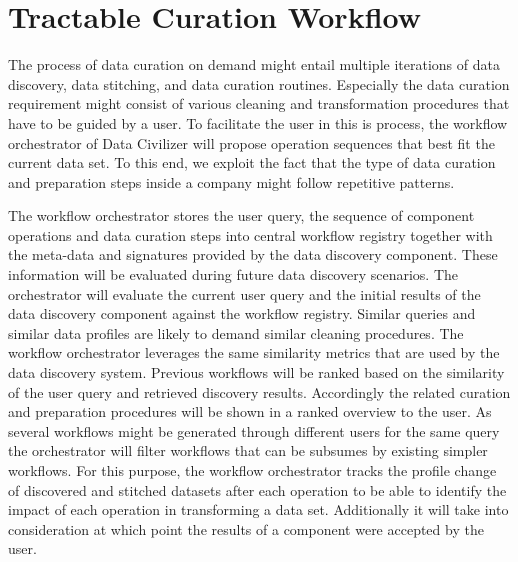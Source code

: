 \section{Tractable Curation Workflow}
\label{sec:workflow}

The process of data curation on demand might entail multiple iterations of data discovery, data stitching, and data curation routines. Especially the data curation requirement might consist of various cleaning and transformation procedures that have to be guided by a user. 
To facilitate the user in this is process, the workflow orchestrator of Data Civilizer will propose operation sequences that best fit the current data set.
To this end, we exploit the fact that the type of data curation and preparation steps  inside a company might follow repetitive patterns.

The workflow orchestrator stores the user query, the sequence of component operations and data curation steps into central workflow registry together with the meta-data and signatures provided by the data discovery component.
These information will be evaluated during future data discovery scenarios. 
The orchestrator will evaluate the current user query and the initial results of the data discovery component against the workflow registry. Similar queries and similar data profiles are likely to demand similar cleaning procedures. The workflow orchestrator leverages the same similarity metrics that are used by the data discovery system.
Previous workflows will be ranked based on the similarity of the user query and retrieved discovery results. 
Accordingly the related curation and preparation procedures will be shown in a ranked overview to the user. 
As several workflows might be generated through different users for the same query the orchestrator will filter workflows that can be subsumes by existing simpler workflows. 
For this purpose, the workflow orchestrator tracks the profile change of discovered and stitched datasets after each operation to be able to identify the impact of each operation in transforming a data set. Additionally it will take into consideration at which point the results of a component were accepted by the user.
